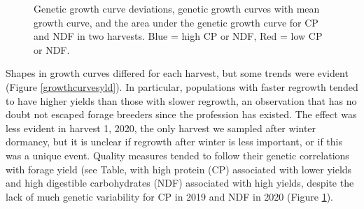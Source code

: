 \documentclass[12pt, letterpaper]{article}
\begin{document}
\begin{figure}
\vspace{-1cm}
\caption{Genetic growth curve deviations, genetic growth curves with mean growth curve, and the area under the genetic growth curve for CP and NDF in two harvests. Blue = high CP or NDF, Red = low CP or NDF.}
\label{growthcurvesqual}
\end{figure}

Shapes in growth curves differed for each harvest, but some trends were evident (Figure \ref{growthcurvesyld}). In particular, populations with faster regrowth tended to have higher yields than those with slower regrowth, an observation that has no doubt not escaped forage breeders since the profession has existed. The effect was less evident in harvest 1, 2020, the only harvest we sampled after winter dormancy, but it is unclear if regrowth after winter is less important, or if this was a unique event. Quality measures tended to follow their genetic correlations with forage yield (see Table, with high protein (CP) associated with lower yields and high digestible carbohydrates (NDF) associated with high yields, despite the lack of much genetic variability for CP in 2019 and NDF in 2020 (Figure \ref{growthcurvesqual}). 
\end{document}
